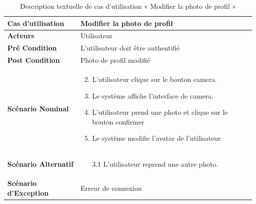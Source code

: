 \begin{longtable}{|p{5cm}|p{10cm}|}
  \caption{Description textuelle de cas d'utilisation « Modifier la photo de profil   »} \label{tab:use_case_modify_profile_picture} \\
\hline
\textbf{Cas d'utilisation}&Modifier la photo de profil   \\
\hline
\textbf{Acteurs}&Utilisateur\\
\hline
\textbf{Pré Condition}&L'utilisateur doit être authentifié\\
\hline
\textbf{Post Condition}&Photo de profil modifié \\
\hline
\textbf{Scénario Nominal}&
\vspace{-\baselineskip}
\begin{enumerate}
  \setcounter{enumi}{1}
  \item L'utilisateur clique sur le bouton camera.
  \item Le système affiche l'interface de camera.
  \item L'utilisateur prend une photo et clique sur le bouton confirmer 
  \item Le système modifie l'avatar de l'utilisateur
\end{enumerate}\\
\hline
\textbf{Scénario Alternatif}&
\vspace{-\baselineskip}
\begin{enumerate}
 \item [3.1] L'utilisateur reprend une autre photo.
\end{enumerate}\\
\hline
\textbf{Scénario d'Exception}&
Erreur de connexion\\
\hline

\end{longtable}


